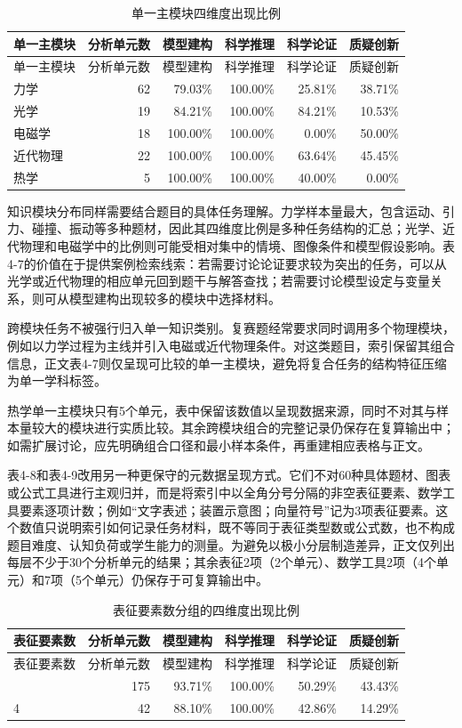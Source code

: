 \documentclass[
  12pt,
  a4paper]{ctexbook}
\begin{document}
\begin{longtable}[]{@{}lrrrrr@{}}
\caption{单一主模块四维度出现比例}\tabularnewline
\toprule\noalign{}
\rowcolor{ThesisPale}
单一主模块 & 分析单元数 & 模型建构 & 科学推理 & 科学论证 & 质疑创新 \\
\midrule\noalign{}
\endfirsthead
\toprule\noalign{}
\rowcolor{ThesisPale}
单一主模块 & 分析单元数 & 模型建构 & 科学推理 & 科学论证 & 质疑创新 \\
\midrule\noalign{}
\endhead
\bottomrule\noalign{}
\endlastfoot
力学 & 62 & 79.03\% & 100.00\% & 25.81\% & 38.71\% \\
光学 & 19 & 84.21\% & 100.00\% & 84.21\% & 10.53\% \\
电磁学 & 18 & 100.00\% & 100.00\% & 0.00\% & 50.00\% \\
近代物理 & 22 & 100.00\% & 100.00\% & 63.64\% & 45.45\% \\
热学 & 5 & 100.00\% & 100.00\% & 40.00\% & 0.00\% \\
\end{longtable}

知识模块分布同样需要结合题目的具体任务理解。力学样本量最大，包含运动、引力、碰撞、振动等多种题材，因此其四维度比例是多种任务结构的汇总；光学、近代物理和电磁学中的比例则可能受相对集中的情境、图像条件和模型假设影响。表4-7的价值在于提供案例检索线索：若需要讨论论证要求较为突出的任务，可以从光学或近代物理的相应单元回到题干与解答查找；若需要讨论模型设定与变量关系，则可从模型建构出现较多的模块中选择材料。

跨模块任务不被强行归入单一知识类别。复赛题经常要求同时调用多个物理模块，例如以力学过程为主线并引入电磁或近代物理条件。对这类题目，索引保留其组合信息，正文表4-7则仅呈现可比较的单一主模块，避免将复合任务的结构特征压缩为单一学科标签。

热学单一主模块只有5个单元，表中保留该数值以呈现数据来源，同时不对其与样本量较大的模块进行实质比较。其余跨模块组合的完整记录仍保存在复算输出中；如需扩展讨论，应先明确组合口径和最小样本条件，再重建相应表格与正文。

表4-8和表4-9改用另一种更保守的元数据呈现方式。它们不对60种具体题材、图表或公式工具进行主观归并，而是将索引中以全角分号分隔的非空表征要素、数学工具要素逐项计数；例如``文字表述；装置示意图；向量符号''记为3项表征要素。这个数值只说明索引如何记录任务材料，既不等同于表征类型数或公式数，也不构成题目难度、认知负荷或学生能力的测量。为避免以极小分层制造差异，正文仅列出每层不少于30个分析单元的结果；其余表征2项（2个单元）、数学工具2项（4个单元）和7项（5个单元）仍保存于可复算输出中。

\begin{longtable}[]{@{}lrrrrr@{}}
\caption{表征要素数分组的四维度出现比例}\tabularnewline
\toprule\noalign{}
\rowcolor{ThesisPale}
表征要素数 & 分析单元数 & 模型建构 & 科学推理 & 科学论证 & 质疑创新 \\
\midrule\noalign{}
\endfirsthead
\toprule\noalign{}
\rowcolor{ThesisPale}
表征要素数 & 分析单元数 & 模型建构 & 科学推理 & 科学论证 & 质疑创新 \\
\midrule\noalign{}
\endhead
\bottomrule\noalign{}
\endlastfoot
3 & 175 & 93.71\% & 100.00\% & 50.29\% & 43.43\% \\
4 & 42 & 88.10\% & 100.00\% & 42.86\% & 14.29\% \\
\end{longtable}
\end{document}
